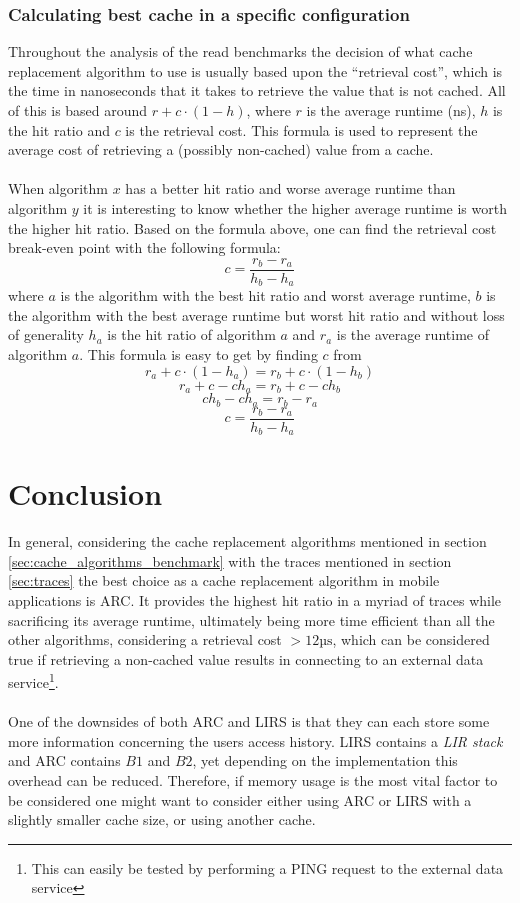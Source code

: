 \documentclass[pdftex,a4paper,12pt,twoside]{report}
\begin{document}
\subsubsection{Calculating best cache in a specific configuration}
Throughout the analysis of the read benchmarks the decision of what cache replacement algorithm to use is usually based upon the ``retrieval cost'', which is the time in nanoseconds that it takes to retrieve the value that is not cached. All of this is based around $r + c \cdot (1 - h)$, where $r$ is the average runtime (ns), $h$ is the hit ratio and $c$ is the retrieval cost. This formula is used to represent the average cost of retrieving a (possibly non-cached) value from a cache.
\\\\
When algorithm $x$ has a better hit ratio and worse average runtime than algorithm $y$ it is interesting to know whether the higher average runtime is worth the higher hit ratio. Based on the formula above, one can find the retrieval cost break-even point with the following formula:
\[
c = \frac{r_b-r_a}{h_b-h_a}
\]
where $a$ is the algorithm with the best hit ratio and worst average runtime, $b$ is the algorithm with the best average runtime but worst hit ratio and without loss of generality $h_a$ is the hit ratio of algorithm $a$ and $r_a$ is the average runtime of algorithm $a$. This formula is easy to get by finding $c$ from 
\[
r_a + c \cdot (1 - h_a) = r_b + c \cdot (1 - h_b)
\]\[
r_a + c - ch_a = r_b + c - ch_b
\]\[
ch_b - ch_a = r_b - r_a
\]\[
c = \frac{r_b - r_a}{h_b - h_a}
\]
\section{Conclusion}
In general, considering the cache replacement algorithms mentioned in section \ref{sec:cache_algorithms_benchmark} with the traces mentioned in section \ref{sec:traces} the best choice as a cache replacement algorithm in mobile applications is ARC. It provides the highest hit ratio in a myriad of traces while sacrificing its average runtime, ultimately being more time efficient than all the other algorithms, considering a retrieval cost $> 12\text{µs}$, which can be considered true if retrieving a non-cached value results in connecting to an external data service\footnote{This can easily be tested by performing a PING request to the external data service}.
\\\\
One of the downsides of both ARC and LIRS is that they can each store some more information concerning the users access history. LIRS contains a \emph{LIR stack} and ARC contains $B1$ and $B2$, yet depending on the implementation this overhead can be reduced. Therefore, if memory usage is the most vital factor to be considered one might want to consider either using ARC or LIRS with a slightly smaller cache size, or using another cache.
\end{document}
